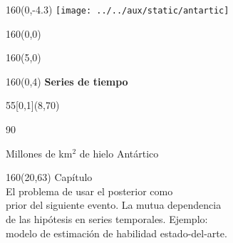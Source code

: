 \documentclass[shownotes,aspectratio=169]{beamer}
\newcounter{capitulo}
\newcommand{\unidad}{\thecapitulo \stepcounter{capitulo}}
\begin{document}
\begin{frame}
\begin{textblock}{160}(0,-4.3) \centering
\texttt{[image: ../../aux/static/antartic]}
\end{textblock}

\begin{textblock}{160}(0,0) \centering
{}
\end{textblock}

\begin{textblock}{160}(5,0)
\end{textblock}


\begin{textblock}{160}(0,4) \centering
\LARGE \hspace{1cm} \textcolor{black!10}{\fontsize{22}{0}\selectfont \textbf{Series de tiempo}}
\end{textblock}


\begin{textblock}{55}[0,1](8,70)
\begin{turn}{90}
\parbox{6cm}{\footnotesize
\textcolor{black!10}{Millones de km$^2$ de hielo Antártico}}
\end{turn}
\end{textblock}


\begin{textblock}{160}(20,63)
\textcolor{black!5}{Capítulo \unidad \\ \small
El problema de usar el posterior como \\
prior del siguiente evento. La mutua dependencia \\
de las hipótesis en series temporales. Ejemplo:  \\
modelo de estimación de habilidad estado-del-arte. \\
}
\end{textblock}


\end{frame}
\end{document}
